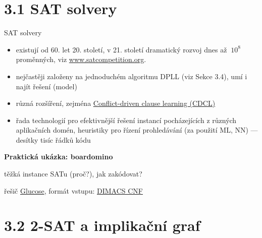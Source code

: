 \documentclass{beamer}
\begin{document}
\section{3.1 SAT solvery}


\begin{frame}{SAT solvery}

    \begin{itemize}
        \item existují od 60. let 20. století, v 21. století dramatický rozvoj dnes až $~10^8$ proměnných, viz \href{http://www.satcompetition.org}{\alert{www.satcompetition.org}}.\pause
        \item nejčastěji založeny na jednoduchém \alert{algoritmu DPLL} (viz Sekce 3.4), umí i najít řešení (model)\pause
        \item různá rozšíření, zejména \href{https://en.wikipedia.org/wiki/Conflict-driven_clause_learning}{\alert{Conflict-driven clause learning (CDCL)}}\pause
        \item řada technologií pro efektivnější řešení instancí pocházejících z různých aplikačních domén, heuristiky pro řízení prohledávání (za použití ML, NN) --- desítky tisíc řádků kódu
    \end{itemize}
    
    \pause
    \textbf{Praktická ukázka: boardomino}

    \smallskip


    \smallskip

    \pause
    těžká instance SATu (proč?), jak zakódovat? 
    
    \pause
    řešič \href{http://www.labri.fr/perso/lsimon/glucose/}{\alert{Glucose}}, formát vstupu: \href{http://people.sc.fsu.edu/~jburkardt/data/cnf/cnf.html}{\alert{DIMACS CNF}}
    
\end{frame}


\section{3.2 2-SAT a implikační graf}
\end{document}
